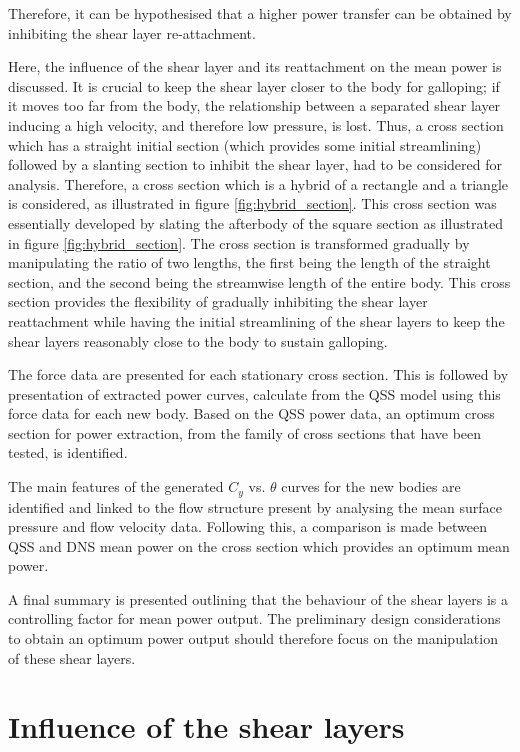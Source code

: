 Therefore, it can be hypothesised that a higher power transfer can be obtained by inhibiting the shear layer re-attachment. 

Here, the influence of the shear layer and its reattachment on the mean power is discussed. It is crucial to keep the shear layer closer to the body for galloping; if it moves too far from the body, the relationship between a separated shear layer inducing a high velocity, and therefore low pressure, is lost. Thus, a cross section which has a straight initial section (which provides some initial streamlining) followed by a slanting section to inhibit the shear layer, had to be considered for analysis. Therefore, a cross section which is a hybrid of a rectangle and a triangle is considered, as illustrated in figure \ref{fig:hybrid_section}. This cross section was essentially developed by slating the afterbody of the square section as illustrated in figure \ref{fig:hybrid_section}. The cross section is transformed gradually by manipulating the ratio of two lengths, the first being the length of the straight section, and the second being the streamwise length of the entire body. This cross section provides the flexibility of gradually inhibiting the shear layer reattachment while having the initial streamlining of the shear layers to keep the shear layers reasonably close to the body to sustain galloping. 

The force data are presented for each stationary cross section. This is followed by presentation of extracted power curves, calculate from the QSS model using this force data for each new body. Based on the QSS power data, an optimum cross section for power extraction, from the family of cross sections that have been tested, is identified.

The main features of the generated $C_y$ vs. $\theta$ curves for the
new bodies are identified and linked to the flow structure present by
analysing the mean surface pressure and flow velocity data. Following
this, a comparison is made between QSS and DNS mean power on the cross
section which provides an optimum mean power.

A final summary is presented outlining that the behaviour of the shear layers is a controlling factor for mean power output. The preliminary design considerations to obtain an optimum power output should therefore focus on the manipulation of these shear layers. 





\section{Influence of the shear layers}

